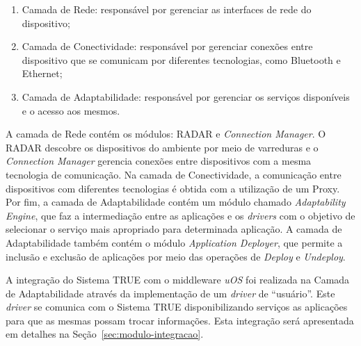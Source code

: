 	\begin{enumerate}
		\item Camada de Rede: responsável por gerenciar as interfaces de rede do dispositivo;
		\item Camada de Conectividade: responsável por gerenciar conexões entre dispositivo que se comunicam por diferentes tecnologias, como Bluetooth e Ethernet;
		\item Camada de Adaptabilidade: responsável por gerenciar os serviços disponíveis e o acesso aos mesmos.
	\end{enumerate}

	A camada de Rede contém os módulos: RADAR e \textit{Connection Manager}. O RADAR descobre os dispositivos do ambiente por meio de varreduras e o \textit{Connection Manager} gerencia conexões entre dispositivos com a mesma tecnologia de comunicação. Na camada de Conectividade, a comunicação entre dispositivos com diferentes tecnologias é obtida com a utilização de um Proxy. Por fim, a camada de Adaptabilidade contém um módulo chamado \textit{Adaptability Engine}, que faz a intermediação entre as aplicações e os \textit{drivers} com o objetivo de selecionar o serviço mais apropriado para determinada aplicação. A camada de Adaptabilidade também contém o módulo \textit{Application Deployer}, que permite a inclusão e exclusão de aplicações por meio das operações de \textit{Deploy} e \textit{Undeploy}.

	A integração do Sistema TRUE com o middleware \textit{uOS} foi realizada na
	Camada de Adaptabilidade através da implementação de um \textit{driver} de
	``usuário''. Este \textit{driver} se comunica com o Sistema TRUE
	disponibilizando serviços as aplicações para que as mesmas possam trocar
	informações. Esta integração será apresentada em detalhes na
	Seção~\ref{sec:modulo-integracao}.




